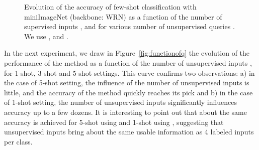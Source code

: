 \documentclass[a4paper,conference]{IEEEtran}
\begin{document}
\begin{figure}[h]
  \begin{center}
  \end{center}
  \vspace{-.5cm}
  \caption{Evolution of the accuracy of few-shot classification with miniImageNet (backbone: WRN) as a function of the number of supervised inputs , and for various number of unsupervised queries . We use ,  and .}
  \label{fig:functionofs}
\end{figure}

In the next experiment, we draw in Figure~\ref{fig:functionofq} the evolution of the performance of the method as a function of the number of unsupervised inputs , for 1-shot, 3-shot and 5-shot settings. This curve confirms two observations: a) in the case of 5-shot setting, the influence of the number of unsupervised inputs is little, and the accuracy of the method quickly reaches its pick and b) in the case of 1-shot setting, the number of unsupervised inputs significantly influences accuracy up to a few dozens. It is interesting to point out that about the same accuracy is achieved for 5-shot using  and 1-shot using , suggesting that  unsupervised inputs bring about the same usable information as 4 labeled inputs per class.
\end{document}
